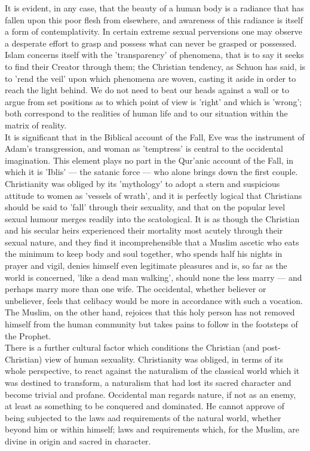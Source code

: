 \documentclass[11pt, b5paper, twoside]{book}
\begin{document}
It is evident, in any case, that the beauty of a human body is a radiance that has fallen upon this 
poor flesh from elsewhere, and awareness of this radiance is itself a form of contemplativity. In 
certain extreme sexual perversions one may observe a desperate effort to grasp and possess what can 
never be grasped or possessed. Islam concerns itself with the 'transparency' of phenomena, that is to 
say it seeks to find their Creator through them; the Christian tendency, as Schuon has said, is to 
'rend the veil' upon which phenomena are woven, casting it aside in order to reach the light behind. 
We do not need to beat our heads against a wall or to argue from set positions as to which point of 
view is 'right' and which is 'wrong'; both correspond to the realities of human life and to our 
situation within the matrix of reality. \\

It is significant that in the Biblical account of the Fall, Eve was the instrument of Adam's 
transgression, and woman as 'temptress' is central to the occidental imagination. This element plays 
no part in the Qur'anic account of the Fall, in which it is 'Iblis' --- the satanic force --- who alone 
brings down the first couple. Christianity was obliged by its 'mythology' to adopt a stern and 
suspicious attitude to women as 'vessels of wrath', and it is perfectly logical that Christians 
should be said to 'fall' through their sexuality, and that on the popular level sexual humour merges 
readily into the scatological. It is as though the Christian and his secular heirs experienced their 
mortality most acutely through their sexual nature, and they find it incomprehensible that a Muslim 
ascetic who eats the minimum to keep body and soul together, who spends half his nights in prayer and 
vigil, denies himself even legitimate pleasures and is, so far as the world is concerned, 'like a 
dead man walking', should none the less marry --- and perhaps marry more than one wife. The occidental, 
whether believer or unbeliever, feels that celibacy would be more in accordance with such a vocation. 
The Muslim, on the other hand, rejoices that this holy person has not removed himself from the human 
community but takes pains to follow in the footsteps of the Prophet. \\

There is a further cultural factor which conditions the Christian (and post-Christian) view of human 
sexuality. Christianity was obliged, in terms of its whole perspective, to react against the 
naturalism of the classical world which it was destined to transform, a naturalism that had lost its 
sacred character and become trivial and profane. Occidental man regards nature, if not as an enemy, 
at least as something to be conquered and dominated. He cannot approve of being subjected to the laws 
aad requirements of the natural world, whether beyond him or within himself; laws and requirements 
which, for the Muslim, are divine in origin and sacred in character. \\
\end{document}
